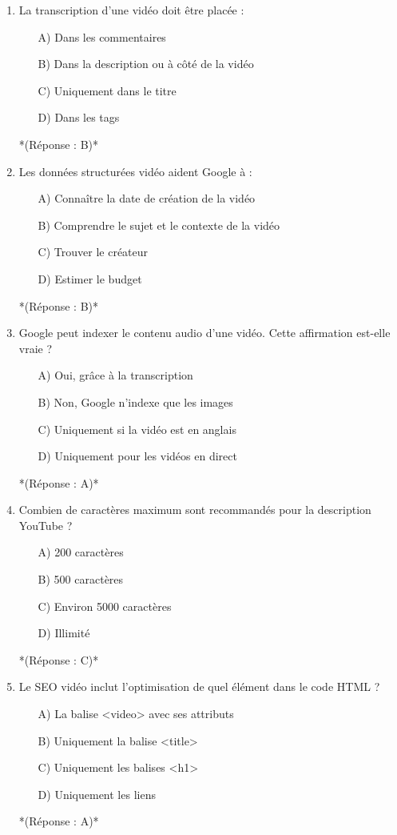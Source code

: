 \documentclass[12pt,a4paper,twoside]{report}
\begin{document}
\begin{enumerate}
    \item La transcription d'une vidéo doit être placée :
    \begin{itemize}
        \item[A)] Dans les commentaires
        \item[B)] Dans la description ou à côté de la vidéo
        \item[C)] Uniquement dans le titre
        \item[D)] Dans les tags
    \end{itemize}
    *(Réponse : B)*

    \item Les données structurées vidéo aident Google à :
    \begin{itemize}
        \item[A)] Connaître la date de création de la vidéo
        \item[B)] Comprendre le sujet et le contexte de la vidéo
        \item[C)] Trouver le créateur
        \item[D)] Estimer le budget
    \end{itemize}
    *(Réponse : B)*

    \item Google peut indexer le contenu audio d'une vidéo. Cette affirmation est-elle vraie ?
    \begin{itemize}
        \item[A)] Oui, grâce à la transcription
        \item[B)] Non, Google n'indexe que les images
        \item[C)] Uniquement si la vidéo est en anglais
        \item[D)] Uniquement pour les vidéos en direct
    \end{itemize}
    *(Réponse : A)*

    \item Combien de caractères maximum sont recommandés pour la description YouTube ?
    \begin{itemize}
        \item[A)] 200 caractères
        \item[B)] 500 caractères
        \item[C)] Environ 5000 caractères
        \item[D)] Illimité
    \end{itemize}
    *(Réponse : C)*

    \item Le SEO vidéo inclut l'optimisation de quel élément dans le code HTML ?
    \begin{itemize}
        \item[A)] La balise <video> avec ses attributs
        \item[B)] Uniquement la balise <title>
        \item[C)] Uniquement les balises <h1>
        \item[D)] Uniquement les liens
    \end{itemize}
    *(Réponse : A)*


\end{enumerate}
\end{document}
